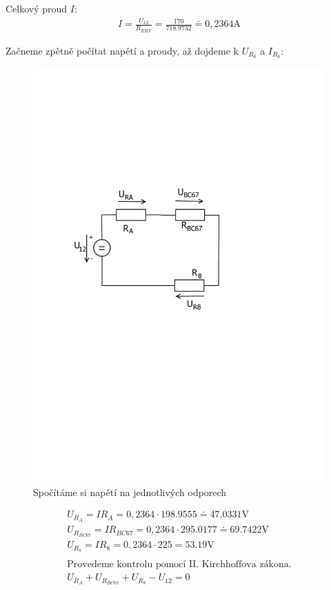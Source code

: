 	Celkový proud $I$:
	\begin{gather*}
		I = \frac{U_{12}}{R_{EKV}} = \frac{170}{718.9732} \doteq 0,2364 \text{A}
	\end{gather*}

	Začneme zpětně počítat napětí a proudy, až dojdeme k $U_{R_6}$ a $I_{R_6}$:

	\begin{figure}[H]
		\center\includegraphics[width=0.6\linewidth]{obr/1_8}
		\caption{Spočítáme si napětí na jednotlivých odporech}
	\end{figure}
	\begin{gather*}
		U_{R_A} = {I R_A} = {0,2364\cdot 198.9555} \doteq 47.0331  \text{V} \\
		U_{R_{BC67}} = {I R_{BC67}} = {0,2364 \cdot 295.0177} \doteq 69.7422  \text{V} \\
		U_{R_8} = {I R_8} = {0,2364 \cdot 225} = 53.19  \text{V} \\
		\\
		\text{Provedeme kontrolu pomocí II. Kirchhoffova zákona.}  \\
		U_{R_A} + U_{R_{BC67}} + U_{R_8} - U_{12} =  0 \\
	\end{gather*}


